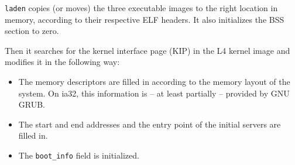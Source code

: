 \texttt{laden} copies (or moves) the three executable images to the
right location in memory, according to their respective ELF headers.
It also initializes the BSS section to zero.

\begin{comment}
  Laden has to deal with overlapping source and destination memory
  areas in an intelligent way.  It currently will detect such
  situations, but is not always able to find a solution, even if one
  exists.
  
  If a memory area stretches out to the very last page addressible in
  32 bit, the high address of the memory descriptor will overflow.
  This is in fact the behaviour of \texttt{kickstart}.  \texttt{laden}
  currently truncates such an area by one page.  This needs
  clarification in the L4 standard.
\end{comment}

Then it searches for the kernel interface page (KIP) in the L4 kernel
image and modifies it in the following way:

\begin{itemize}
\item The memory descriptors are filled in according to the memory
  layout of the system.  On ia32, this information is -- at least
  partially -- provided by GNU GRUB.

  \begin{comment}
    GNU GRUB seems to omit information about the memory that is shared
    with the VGA card.  \texttt{laden} creates a special entry for
    that region, overriding any previous memory descriptor.
  \end{comment}
  
\item The start and end addresses and the entry point of the initial
  servers are filled in.

  \begin{comment}
    A future version of L4 should support adding information about the
    UTCB area of the initial rootserver as well.  Until then, the
    rootserver has no clean way to create a new thread (a hack is used
    by the rootserver to calculate the UTCB addresses for other
    threads).
  \end{comment}

\item The \verb/boot_info/ field is initialized.

  \begin{comment}
    The \verb/boot_info/ field is currently set to the GNU GRUB
    \verb/multiboot_info/ structure.  This only works for the ia32
    architecture of course.  We might want to have a more architecture
    independent way to pass the information about further modules to
    the rootserver.  We also might want to gather the information
    provided by GNU GRUB in a single page (if it is not).
  \end{comment}
\end{itemize}


